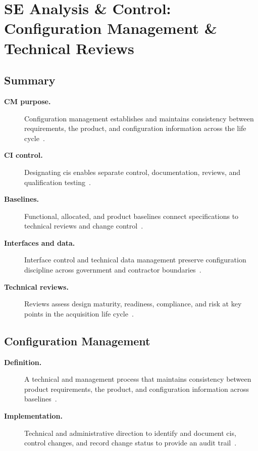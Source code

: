 \documentclass[../main.tex]{subfiles}
\begin{document}
\section{SE Analysis \& Control: Configuration Management \& Technical Reviews}

\subsection{Summary}
\begin{description}
  \item[\textbf{CM purpose.}] Configuration management establishes and maintains consistency between requirements, the product, and configuration information across the life cycle~\autocite{edo-3-5-3-cm-tech-reviews-2025}.
  \item[\textbf{CI control.}] Designating \acp{ci} enables separate control, documentation, reviews, and qualification testing~\autocite{edo-3-5-3-cm-tech-reviews-2025}.
  \item[\textbf{Baselines.}] Functional, allocated, and product baselines connect specifications to technical reviews and change control~\autocite{edo-3-5-3-cm-tech-reviews-2025}.
  \item[\textbf{Interfaces and data.}] Interface control and technical data management preserve configuration discipline across government and contractor boundaries~\autocite{edo-3-5-3-cm-tech-reviews-2025}.
  \item[\textbf{Technical reviews.}] Reviews assess design maturity, readiness, compliance, and risk at key points in the acquisition life cycle~\autocite{edo-3-5-3-cm-tech-reviews-2025}.
\end{description}

\subsection{Configuration Management}
\begin{description}
  \item[\textbf{Definition.}] A technical and management process that maintains consistency between product requirements, the product, and configuration information across baselines~\autocite{edo-3-5-3-cm-tech-reviews-2025}.
  \item[\textbf{Implementation.}] Technical and administrative direction to identify and document \acp{ci}, control changes, and record change status to provide an audit trail~\autocite{edo-3-5-3-cm-tech-reviews-2025}.
\end{description}
\end{document}
